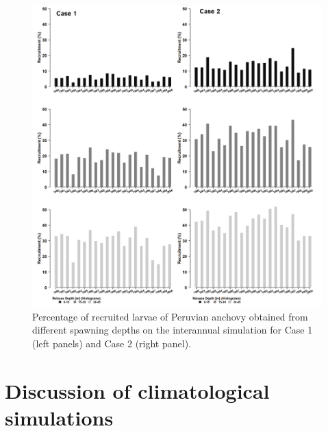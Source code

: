\begin{figure}[ht]
	\includegraphics[width=1.0\textwidth]{figures/Chap3RecruitCase1Case2InterDepths.png}
	\centering
	\caption{Percentage of recruited larvae of Peruvian anchovy obtained from different spawning depths on the interannual simulation for Case 1 (left panels) and Case 2 (right panel).}
	\label{Chap3RecruitCase1Case2InterDepths}
\end{figure}

\clearpage
\section{Discussion of climatological simulations}\label{Chap3Disc1}

